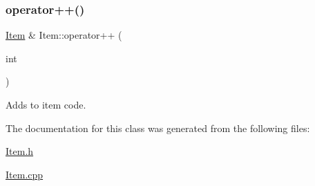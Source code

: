 \subsubsection{\texorpdfstring{operator++()}{operator++()}}
{\footnotesize\ttfamily \mbox{\hyperlink{class_item}{Item}} \& Item\+::operator++ (\begin{DoxyParamCaption}\item[{int}]{ }\end{DoxyParamCaption})}



Adds to item code. 



The documentation for this class was generated from the following files\+:\begin{DoxyCompactItemize}
\item 
\mbox{\hyperlink{_item_8h}{Item.\+h}}\item 
\mbox{\hyperlink{_item_8cpp}{Item.\+cpp}}\end{DoxyCompactItemize}

